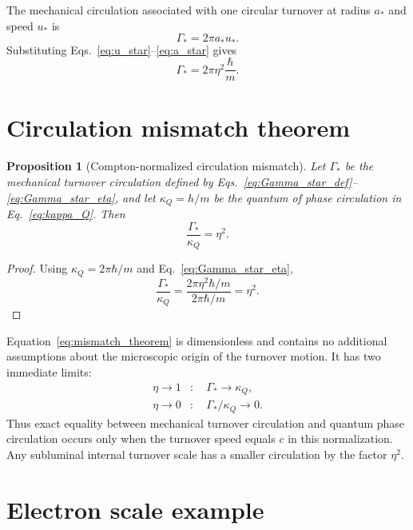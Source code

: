 \documentclass[11pt,a4paper]{article}
\newtheorem{proposition}{Proposition}
\newcommand{\kappaQ}{\kappa_{Q}}
\newcommand{\GammaStar}{\Gamma_{*}}
\newcommand{\uStar}{u_{*}}
\newcommand{\aStar}{a_{*}}
\begin{document}
The mechanical circulation associated with one circular turnover at radius $\aStar$ and speed $\uStar$ is
\begin{equation}
    \GammaStar=2\pi\aStar\uStar.
    \label{eq:Gamma_star_def}
\end{equation}
Substituting Eqs.~\eqref{eq:u_star}--\eqref{eq:a_star} gives
\begin{equation}
    \GammaStar
    =
    2\pi\eta^2\frac{\hbar}{m}.
    \label{eq:Gamma_star_eta}
\end{equation}

\section{Circulation mismatch theorem}

\begin{proposition}[Compton-normalized circulation mismatch]
Let $\GammaStar$ be the mechanical turnover circulation defined by Eqs.~\eqref{eq:Gamma_star_def}--\eqref{eq:Gamma_star_eta}, and let $\kappaQ=h/m$ be the quantum of phase circulation in Eq.~\eqref{eq:kappa_Q}. Then
\begin{equation}
    \boxed{
    \frac{\GammaStar}{\kappaQ}=\eta^2.
    }
    \label{eq:mismatch_theorem}
\end{equation}
\end{proposition}

\begin{proof}
Using $\kappaQ=2\pi\hbar/m$ and Eq.~\eqref{eq:Gamma_star_eta},
\begin{equation}
    \frac{\GammaStar}{\kappaQ}
    =
    \frac{2\pi\eta^2\hbar/m}{2\pi\hbar/m}
    =
    \eta^2.
\end{equation}
\end{proof}

Equation~\eqref{eq:mismatch_theorem} is dimensionless and contains no additional assumptions about the microscopic origin of the turnover motion. It has two immediate limits:
\begin{align}
    \eta\to 1 &: \quad \GammaStar\to\kappaQ,\\
    \eta\to 0 &: \quad \GammaStar/\kappaQ\to 0.
\end{align}
Thus exact equality between mechanical turnover circulation and quantum phase circulation occurs only when the turnover speed equals $c$ in this normalization. Any subluminal internal turnover scale has a smaller circulation by the factor $\eta^2$.

\section{Electron scale example}
\end{document}
